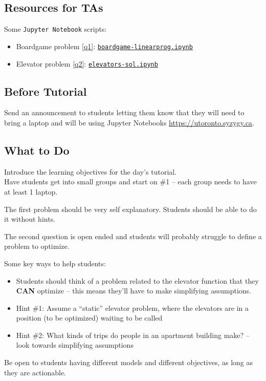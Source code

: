 \subsection*{Resources for TAs}

Some \texttt{Jupyter Notebook} scripts:

\begin{itemize}
	\item Boardgame problem \ref{q1}: \href{https://utoronto.syzygy.ca/jupyter/user-redirect/git-pull?repo=https://github.com/bigfatbernie/IBLMathModeling&subPath=tutorials/tutorial 2/boardgame-linearprog.ipynb}{\tt boardgame-linearprog.ipynb}
	\item Elevator problem \ref{q2}: \href{https://utoronto.syzygy.ca/jupyter/user-redirect/git-pull?repo=https://github.com/bigfatbernie/IBLMathModeling&subPath=tutorials/tutorial 2/elevators-sol.ipynb}{\tt elevators-sol.ipynb}
\end{itemize}


\subsection*{Before Tutorial}

Send an announcement to students letting them know that they will need to bring a laptop and will be using Jupyter Notebooks \url{https://utoronto.syzygy.ca}.


\subsection*{What to Do}
	
Introduce the learning objectives for the day's tutorial. \\

Have students get into small groups and start on \#1 -- each group needs to have at least 1 laptop. 

The first problem should be very self explanatory. Students should be able to do it without hints.

\hfill 

The second question is open ended and students will probably struggle to define a problem to optimize.

Some key ways to help students:
\begin{itemize}
	\item Students should think of a problem related to the elevator function that they \textbf{CAN} optimize -- this means they'll have to make simplifying assumptions.
	\item Hint \#1: Assume a ``static'' elevator problem, where the elevators are in a position (to be optimized) waiting to be called
	\item Hint \#2: What kinds of trips do people in an apartment building make? -- look towards simplifying assumptions
\end{itemize}

Be open to students having different models and different objectives, as long as they are actionable.

	


%
	
	

	
	
